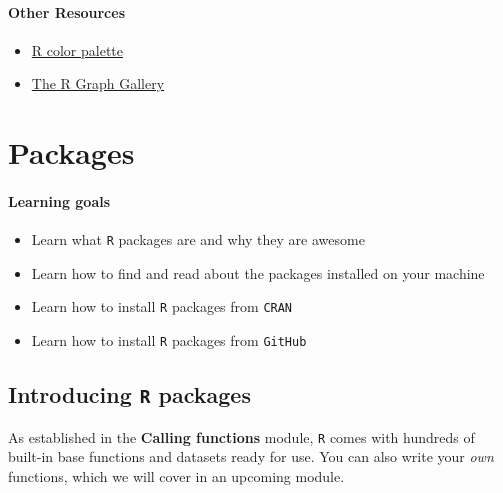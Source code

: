 \documentclass[
]{book}
\providecommand{\tightlist}{%
  \setlength{\itemsep}{0pt}\setlength{\parskip}{0pt}}
\begin{document}
\hypertarget{other-resources-2}{%
\subsubsection*{Other Resources}\label{other-resources-2}}

\begin{itemize}
\tightlist
\item
  \href{http://www.stat.columbia.edu/~tzheng/files/Rcolor.pdf}{R color palette}\\
\item
  \href{https://www.r-graph-gallery.com/}{The R Graph Gallery}
\end{itemize}

\hypertarget{packages}{%
\chapter{Packages}\label{packages}}

\hypertarget{learning-goals-7}{%
\subsubsection*{Learning goals}\label{learning-goals-7}}

\begin{itemize}
\tightlist
\item
  Learn what \texttt{R} packages are and why they are awesome
\item
  Learn how to find and read about the packages installed on your machine
\item
  Learn how to install \texttt{R} packages from \texttt{CRAN}
\item
  Learn how to install \texttt{R} packages from \texttt{GitHub}
\end{itemize}

\hypertarget{introducing-r-packages}{%
\section*{\texorpdfstring{Introducing \texttt{R} packages}{Introducing R packages}}\label{introducing-r-packages}}

As established in the \textbf{Calling functions} module, \texttt{R} comes with hundreds of built-in base functions and datasets ready for use. You can also write your \emph{own} functions, which we will cover in an upcoming module.
\end{document}
